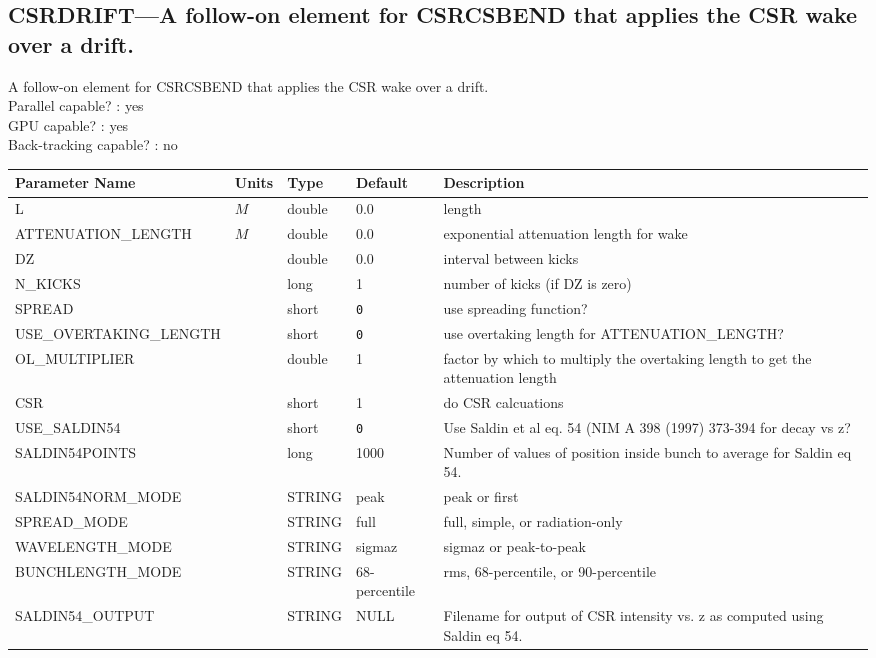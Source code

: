 \subsection{CSRDRIFT---A follow-on element for CSRCSBEND that applies the CSR wake over a drift.}
A follow-on element for CSRCSBEND that applies the CSR wake over a drift.
\\
Parallel capable? : yes\\
GPU capable? : yes\\
Back-tracking capable? : no\\
\begin{tabular}{|l|l|l|l|p{\descwidth}|} \hline
Parameter Name & Units & Type & Default & Description \\ \hline 
L & $M$ & double &  0.0 & length  \\ \hline 
ATTENUATION\_LENGTH & $M$ & double &  0.0 & exponential attenuation length for wake  \\ \hline 
DZ &  & double &  0.0 & interval between kicks  \\ \hline 
N\_KICKS &  & long &   1               & number of kicks (if DZ is zero)  \\ \hline 
SPREAD &  & short &  \verb|0| & use spreading function?  \\ \hline 
USE\_OVERTAKING\_LENGTH &  & short &  \verb|0| & use overtaking length for ATTENUATION\_LENGTH?  \\ \hline 
OL\_MULTIPLIER &  & double &   1 & factor by which to multiply the overtaking length to get the attenuation length  \\ \hline 
CSR &  & short &   1               & do CSR calcuations  \\ \hline 
USE\_SALDIN54 &  & short &  \verb|0| & Use Saldin et al eq. 54 (NIM A 398 (1997) 373-394 for decay vs z?  \\ \hline 
SALDIN54POINTS &  & long &   1000            & Number of values of position inside bunch to average for Saldin eq 54.  \\ \hline 
SALDIN54NORM\_MODE &  & STRING &   peak            & peak or first  \\ \hline 
SPREAD\_MODE &  & STRING &   full            & full, simple, or radiation-only  \\ \hline 
WAVELENGTH\_MODE &  & STRING &   sigmaz          & sigmaz or peak-to-peak  \\ \hline 
BUNCHLENGTH\_MODE &  & STRING &   68-percentile   & rms, 68-percentile, or 90-percentile  \\ \hline 
SALDIN54\_OUTPUT &  & STRING &   NULL            & Filename for output of CSR intensity vs. z as computed using Saldin eq 54.  \\ \hline 

\end{tabular}
